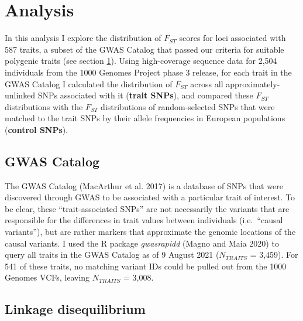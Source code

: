 \documentclass[
]{book}
\begin{document}
\clearpage

\hypertarget{Fst-analysis-chap}{%
\section{Analysis}\label{Fst-analysis-chap}}

In this analysis I explore the distribution of \(F_{ST}\) scores for loci associated with 587 traits, a subset of the GWAS Catalog that passed our criteria for suitable polygenic traits (see section \ref{Fst-analysis-chap}). Using high-coverage sequence data for 2,504 individuals from the 1000 Genomes Project phase 3 release, for each trait in the GWAS Catalog I calculated the distribution of \(F_{ST}\) across all approximately-unlinked SNPs associated with it (\textbf{trait SNPs}), and compared these \(F_{ST}\) distributions with the \(F_{ST}\) distributions of random-selected SNPs that were matched to the trait SNPs by their allele frequencies in European populations (\textbf{control SNPs}).

\hypertarget{gwas-catalog}{%
\subsection{GWAS Catalog}\label{gwas-catalog}}

The GWAS Catalog (MacArthur et al. 2017) is a database of SNPs that were discovered through GWAS to be associated with a particular trait of interest. To be clear, these ``trait-associated SNPs'' are not necessarily the variants that are responsible for the differences in trait values between individuals (i.e.~``causal variants''), but are rather markers that approximate the genomic locations of the causal variants. I used the R package \emph{gwasrapidd} (Magno and Maia 2020) to query all traits in the GWAS Catalog as of 9 August 2021 (\(N_{TRAITS}\) = 3,459). For 541 of these traits, no matching variant IDs could be pulled out from the 1000 Genomes VCFs, leaving \(N_{TRAITS}\) = 3,008.

\hypertarget{linkage-disequilibrium}{%
\subsection{Linkage disequilibrium}\label{linkage-disequilibrium}}
\end{document}
